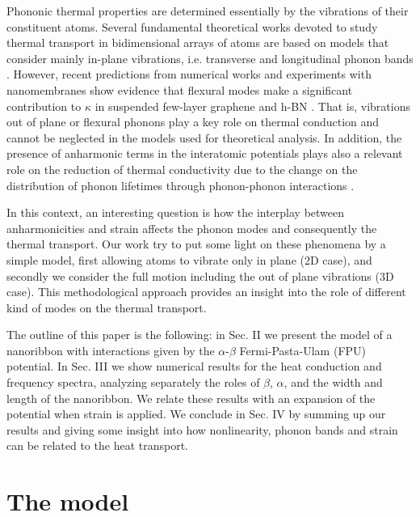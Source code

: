 \documentclass[12pt]{article}
\begin{document}
Phononic thermal properties are determined essentially by the vibrations of their constituent atoms. Several fundamental theoretical works devoted to study thermal transport in bidimensional arrays of atoms are based on models that consider mainly in-plane vibrations, i.e. transverse and longitudinal phonon bands \cite{dhar, gendel}. However, recent predictions from numerical works and experiments with nanomembranes show evidence that flexural modes make a significant contribution to $\kappa$ in suspended few-layer graphene and h-BN \cite{review}. That is, vibrations out of plane or flexural phonons play a key role on thermal conduction \cite{xu} and cannot be neglected in the models used for theoretical analysis. In addition, the presence of anharmonic terms in the interatomic potentials plays also a relevant role on the reduction of thermal conductivity due to the change on the distribution of phonon lifetimes through phonon-phonon interactions \cite{zhou}.

In this context, an interesting question is how the interplay between anharmonicities and strain affects the phonon modes and consequently the thermal transport. Our work try to put some light on these phenomena by  a simple model, first allowing atoms to vibrate only in plane (2D case), and secondly we consider the full motion including the out of plane vibrations (3D case). This methodological approach provides an insight into the role of different kind of modes on the thermal transport.

The outline of this paper is the following: in Sec. II we present the model of a nanoribbon with interactions given by the $\alpha$-$\beta$ Fermi-Pasta-Ulam (FPU) potential. In Sec. III we show numerical results for the heat conduction and frequency spectra, analyzing separately the roles of $\beta$, $\alpha$, and the width and length of the nanoribbon. We relate these results with an expansion of the potential when strain is applied. We conclude in Sec. IV by summing up our results and giving some insight into how nonlinearity, phonon bands and strain can be related to the heat transport.


\section{The model}
\end{document}
